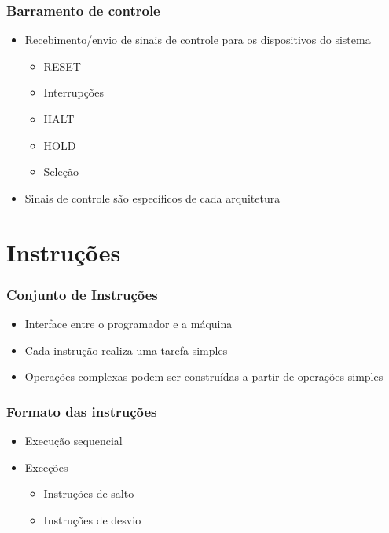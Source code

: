 \documentclass[aspectratio=169,
				xcolor=table]{beamer}
\begin{document}
	\begin{frame}
		\frametitle{Barramento de controle}
		\begin{itemize}
			\item Recebimento/envio de sinais de controle para os dispositivos do sistema
			\begin{itemize}
				\item RESET
				\item Interrupções
				\item HALT
				\item HOLD
				\item Seleção

			\end{itemize}
			\vspace{1em}
			\item Sinais de controle são específicos de cada arquitetura
		\end{itemize}
	\end{frame}
	
		
	\section{Instruções}

	\begin{frame}
		\frametitle{Conjunto de Instruções}
		\begin{itemize}
			\item Interface entre o programador e a máquina
			\vspace{1em}
			\item Cada instrução realiza uma tarefa simples
			\vspace{1em}
			\item Operações complexas podem ser construídas a partir de operações simples
		\end{itemize}
	\end{frame}
	
	
	\begin{frame}
		\frametitle{Formato das instruções}
		\begin{itemize}
			\item Execução sequencial
			\vspace{1em}
			\item Exceções
			\begin{itemize}
				\item Instruções de salto
				\item Instruções de desvio
			\end{itemize}
		\end{itemize}
	\end{frame}
	
\end{document}
